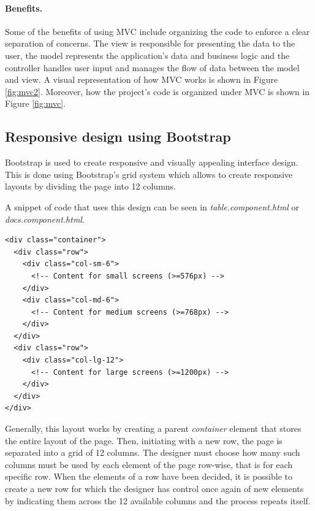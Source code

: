 \documentclass[multi, tikz, a4paper, oneside]{article}
\begin{document}
\label{sec:mvc}
\paragraph{Benefits.}
Some of the benefits of using MVC include organizing the code to enforce a clear
separation of concerns. The view is responsible for presenting the data to the
user, the model represents the application's data and business logic and the
controller handles user input and manages the flow of data between the model and
view. A visual representation of how MVC works is shown in Figure
\ref{fig:mvc2}. Moreover, how the project's code is organized under MVC is shown
in Figure \ref{fig:mvc}.



\subsection{Responsive design using Bootstrap}
Bootstrap is used to create responsive and visually appealing interface design.
This is done using Bootstrap's grid system which allows to create responsive
layouts by dividing the page into 12 columns.

A snippet of code that uses this design can be seen in
{\em{table.component.html}} or {\em{docs.component.html}}.
\begin{lstlisting}[style=htmlstyle, caption={Responsive Design HTML Code}, label=html-code]
<div class="container">
  <div class="row">
    <div class="col-sm-6">
      <!-- Content for small screens (>=576px) -->
    </div>
    <div class="col-md-6">
      <!-- Content for medium screens (>=768px) -->
    </div>
  </div>
  <div class="row">
    <div class="col-lg-12">
      <!-- Content for large screens (>=1200px) -->
    </div>
  </div>
</div>
\end{lstlisting}

Generally, this layout works by creating a parent {\em{container}} element that
stores the entire layout of the page. Then, initiating with a new row, the page
is separated into a grid of 12 columns. The designer must choose how many such
columns must be used by each element of the page row-wise, that is for each
specific row. When the elements of a row have been decided, it is possible to
create a new row for which the designer has control once again of new elements
by indicating them across the 12 available columns and the process repeats
itself.

\end{document}
